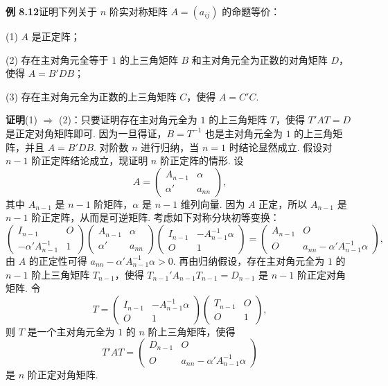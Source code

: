 \documentclass[UTF8, 12pt, fontset=fandol, oneside]{ctexart}
\begin{document}
\noindent\textbf{例 8.12}\quad 证明下列关于 $n$ 阶实对称矩阵 $A=(a_{ij})$ 的命题等价：

(1) $A$ 是正定阵；

(2) 存在主对角元全等于 $1$ 的上三角矩阵 $B$ 和主对角元全为正数的对角矩阵 $D$，使得 $A=B'DB$；

(3) 存在主对角元全为正数的上三角矩阵 $C$，使得 $A=C'C$.

\noindent\textbf{证明}\quad (1) $\Rightarrow$ (2)：只要证明存在主对角元全为 $1$ 的上三角矩阵 $T$，使得 $T'AT=D$ 是正定对角矩阵即可. 因为一旦得证，$B=T^{-1}$ 也是主对角元全为 $1$ 的上三角矩阵，并且 $A=B'DB$. 对阶数 $n$ 进行归纳，当 $n=1$ 时结论显然成立. 假设对 $n-1$ 阶正定阵结论成立，现证明 $n$ 阶正定阵的情形. 设
\[
A=\left(\begin{array}{cc}
A_{n-1} & \alpha\\
\alpha' & a_{nn}
\end{array}\right),
\]
其中 $A_{n-1}$ 是 $n-1$ 阶矩阵，$\alpha$ 是 $n-1$ 维列向量. 因为 $A$ 正定，所以 $A_{n-1}$ 是 $n-1$ 阶正定阵，从而是可逆矩阵. 考虑如下对称分块初等变换：
\[
\left(\begin{array}{cc}
I_{n-1} & O\\
-\alpha'A_{n-1}^{-1} & 1
\end{array}\right)
\left(\begin{array}{cc}
A_{n-1} & \alpha\\
\alpha' & a_{nn}
\end{array}\right)
\left(\begin{array}{cc}
I_{n-1} & -A_{n-1}^{-1}\alpha\\
O & 1
\end{array}\right)
=
\left(\begin{array}{cc}
A_{n-1} & O\\
O & a_{nn}-\alpha'A_{n-1}^{-1}\alpha
\end{array}\right),
\]
由 $A$ 的正定性可得 $a_{nn}-\alpha'A_{n-1}^{-1}\alpha>0$. 再由归纳假设，存在主对角元全为 $1$ 的 $n-1$ 阶上三角矩阵 $T_{n-1}$，使得 $T_{n-1}'A_{n-1}T_{n-1}=D_{n-1}$ 是 $n-1$ 阶正定对角矩阵. 令
\[
T=
\left(\begin{array}{cc}
I_{n-1} & -A_{n-1}^{-1}\alpha\\
O & 1
\end{array}\right)
\left(\begin{array}{cc}
T_{n-1} & O\\
O & 1
\end{array}\right),
\]
则 $T$ 是一个主对角元全为 $1$ 的 $n$ 阶上三角矩阵，使得
\[
T'AT=
\left(\begin{array}{cc}
D_{n-1} & O\\
O & a_{nn}-\alpha'A_{n-1}^{-1}\alpha
\end{array}\right)
\]
是 $n$ 阶正定对角矩阵.
\end{document}
